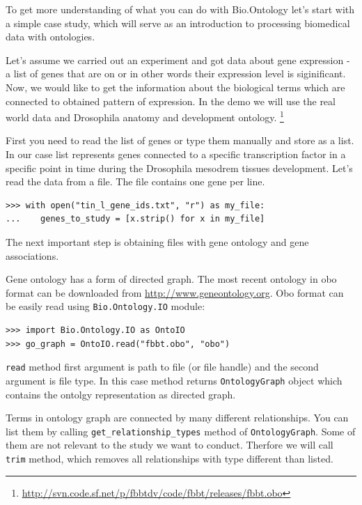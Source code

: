\documentclass{report}
\begin{document}
To get more understanding of what you can do with Bio.Ontology let's start with
a simple case study, which will serve as an introduction to processing
biomedical data with ontologies. 

Let's assume we carried out an experiment and got data about gene expression -
a list of genes that are on or in other words their expression level is
siginificant. Now, we would like to get the
information about the biological terms which are connected to obtained pattern
of expression. In the demo we will use the real world data and Drosophila anatomy and development ontology.
\footnote{\url{http://svn.code.sf.net/p/fbbtdv/code/fbbt/releases/fbbt.obo}}

First you need to read the list of genes or type them manually and store as
a list. In our case list represents genes connected to a specific transcription
factor in a specific point in time during the Drosophila mesodrem tissues development.
Let's read the data from a file. The file contains one gene per line.

\begin{verbatim}
>>> with open("tin_l_gene_ids.txt", "r") as my_file:
...    genes_to_study = [x.strip() for x in my_file]

\end{verbatim}

The next important step is obtaining files with gene ontology and gene
associations.

Gene ontology has a form of directed graph.
The most recent ontology in obo format can be downloaded from
\url{http://www.geneontology.org}. Obo format can be easily read using
\verb|Bio.Ontology.IO| module:

\begin{verbatim}
>>> import Bio.Ontology.IO as OntoIO
>>> go_graph = OntoIO.read("fbbt.obo", "obo")
\end{verbatim}

\verb|read| method first argument is path to file (or file handle) and the
second argument is file type. In this case method returns \verb|OntologyGraph|
object which contains the ontolgy representation as directed graph.

Terms in ontology graph are connected by many different relationships. You can
list them by calling \verb|get_relationship_types| method of \verb|OntologyGraph|.
Some of them are not relevant to the study we want to conduct. Therfore we will
call \verb|trim| method, which removes all relationships with type different
than listed.
\end{document}
